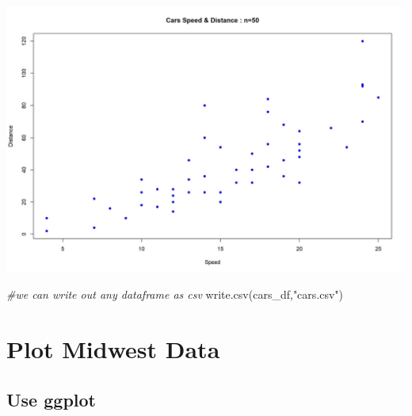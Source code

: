 \documentclass[
]{article}
\newenvironment{Shaded}{\begin{snugshade}}{\end{snugshade}}
\newcommand{\AttributeTok}[1]{\textcolor[rgb]{0.77,0.63,0.00}{#1}}
\newcommand{\CommentTok}[1]{\textcolor[rgb]{0.56,0.35,0.01}{\textit{#1}}}
\newcommand{\DecValTok}[1]{\textcolor[rgb]{0.00,0.00,0.81}{#1}}
\newcommand{\FunctionTok}[1]{\textcolor[rgb]{0.00,0.00,0.00}{#1}}
\newcommand{\NormalTok}[1]{#1}
\newcommand{\SpecialCharTok}[1]{\textcolor[rgb]{0.00,0.00,0.00}{#1}}
\newcommand{\StringTok}[1]{\textcolor[rgb]{0.31,0.60,0.02}{#1}}
\begin{document}
\begin{Shaded}
\end{Shaded}

\includegraphics{figures/Cars-speed_dist-2.jpeg}

\begin{Shaded}
\begin{Highlighting}[]
\CommentTok{\#we can write out any dataframe as csv }
\FunctionTok{write.csv}\NormalTok{(cars\_df,}\StringTok{"cars.csv"}\NormalTok{)}
\end{Highlighting}
\end{Shaded}

\hypertarget{plot-midwest-data}{%
\section{Plot Midwest Data}\label{plot-midwest-data}}

\hypertarget{use-ggplot}{%
\subsection{Use ggplot}\label{use-ggplot}}
\end{document}
